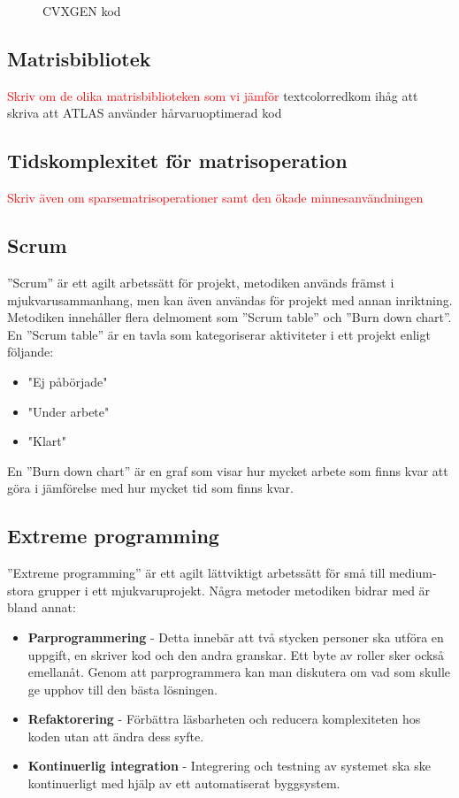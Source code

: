 \begin{figure}[H]

\caption{CVXGEN kod \citep{cvxgen2}}
\label{fig:cvxgen}
\end{figure}  


\subsection{Matrisbibliotek}
\textcolor{red}{Skriv om de olika matrisbiblioteken som vi jämför}
textcolor{red}{kom ihåg att skriva att ATLAS använder hårvaruoptimerad kod}

\subsection{Tidskomplexitet för matrisoperation}
\textcolor{red}{Skriv även om sparsematrisoperationer samt den ökade minnesanvändningen}
\subsection{Scrum}
''Scrum'' är ett agilt arbetssätt för projekt, metodiken används främst i mjukvarusammanhang, men kan även användas för projekt med annan inriktning. Metodiken innehåller flera delmoment som ''Scrum table'' och ''Burn down chart''. En ''Scrum table'' är en tavla som kategoriserar aktiviteter i ett projekt enligt följande: 
\begin{itemize}
  \item "Ej påbörjade"
  \item "Under arbete"
  \item "Klart"
\end{itemize} 
En ''Burn down chart'' är en graf som visar hur mycket arbete som finns kvar att göra i jämförelse med hur mycket tid som finns kvar. \citep{scrum}

\subsection{Extreme programming}
''Extreme programming'' är ett agilt lättviktigt arbetssätt för små till medium-stora grupper i ett mjukvaruprojekt. Några metoder metodiken bidrar med är bland annat:     
\begin{itemize}
\item \textbf{Parprogrammering} - Detta innebär att två stycken personer ska utföra en uppgift, en skriver kod och den andra granskar. Ett byte av roller sker också emellanåt. Genom att parprogrammera kan man diskutera om vad som skulle ge upphov till den bästa lösningen. 
\item \textbf{Refaktorering} - Förbättra läsbarheten och reducera komplexiteten hos koden utan att ändra dess syfte.
\item \textbf{Kontinuerlig integration} - Integrering och testning av systemet ska ske kontinuerligt med hjälp av ett automatiserat byggsystem. 
\end{itemize}
\citep{kristiansandahl}
